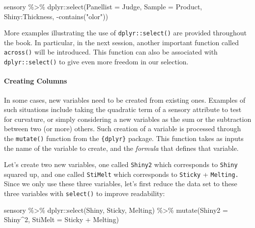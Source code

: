 \documentclass[
]{krantz}
\makeatletter
\newenvironment{Shaded}{\begin{snugshade}}{\end{snugshade}}
\newcommand{\AttributeTok}[1]{\textcolor[rgb]{0.61,0.61,0.61}{#1}}
\newcommand{\DecValTok}[1]{\textcolor[rgb]{0.06,0.06,0.06}{#1}}
\newcommand{\FunctionTok}[1]{\textcolor[rgb]{0,0,0}{#1}}
\newcommand{\NormalTok}[1]{#1}
\newcommand{\SpecialCharTok}[1]{\textcolor[rgb]{0,0,0}{#1}}
\newcommand{\StringTok}[1]{\textcolor[rgb]{0.5,0.5,0.5}{#1}}
\newenvironment{kframe}{%
\medskip{}
\setlength{\fboxsep}{.8em}
 \def\at@end@of@kframe{}%
 \ifinner\ifhmode%
  \def\at@end@of@kframe{\end{minipage}}%
  \begin{minipage}{\columnwidth}%
 \fi\fi%
 \def\FrameCommand##1{\hskip\@totalleftmargin \hskip-\fboxsep
 \colorbox{shadecolor}{##1}\hskip-\fboxsep
     \hskip-\linewidth \hskip-\@totalleftmargin \hskip\columnwidth}%
 \MakeFramed {\advance\hsize-\width
   \@totalleftmargin\z@ \linewidth\hsize
   \@setminipage}}%
 {\par\unskip\endMakeFramed%
 \at@end@of@kframe}
\renewenvironment{Shaded}{\begin{kframe}}{\end{kframe}}
\makeatother
\begin{document}
\begin{Shaded}
\begin{Highlighting}[]
\NormalTok{sensory }\SpecialCharTok{\%\textgreater{}\%}
\NormalTok{  dplyr}\SpecialCharTok{::}\FunctionTok{select}\NormalTok{(}\AttributeTok{Panellist =}\NormalTok{ Judge, }\AttributeTok{Sample =}\NormalTok{ Product, }
\NormalTok{                Shiny}\SpecialCharTok{:}\NormalTok{Thickness, }\SpecialCharTok{{-}}\FunctionTok{contains}\NormalTok{(}\StringTok{"olor"}\NormalTok{))}
\end{Highlighting}
\end{Shaded}

More examples illustrating the use of \texttt{dplyr::select()} are provided throughout the book. In particular, in the next session, another important function called \texttt{across()} will be introduced. This function can also be associated with \texttt{dplyr::select()} to give even more freedom in our selection.

\hypertarget{creating-columns}{%
\paragraph*{Creating Columns}\label{creating-columns}}

In some cases, new variables need to be created from existing ones. Examples of such situations include taking the quadratic term of a sensory attribute to test for curvature, or simply considering a new variables as the sum or the subtraction between two (or more) others. Such creation of a variable is processed through the \texttt{mutate()} function from the \texttt{\{dplyr\}} package. This function takes as inputs the name of the variable to create, and the \emph{formula} that defines that variable.

Let's create two new variables, one called \texttt{Shiny2} which corresponds to \texttt{Shiny} squared up, and one called \texttt{StiMelt} which corresponds to \texttt{Sticky} + \texttt{Melting.} Since we only use these three variables, let's first reduce the data set to these three variables with \texttt{select()} to improve readability:

\begin{Shaded}
\begin{Highlighting}[]
\NormalTok{sensory }\SpecialCharTok{\%\textgreater{}\%}
\NormalTok{  dplyr}\SpecialCharTok{::}\FunctionTok{select}\NormalTok{(Shiny, Sticky, Melting) }\SpecialCharTok{\%\textgreater{}\%}
  \FunctionTok{mutate}\NormalTok{(}\AttributeTok{Shiny2 =}\NormalTok{ Shiny}\SpecialCharTok{\^{}}\DecValTok{2}\NormalTok{,}
         \AttributeTok{StiMelt =}\NormalTok{ Sticky }\SpecialCharTok{+}\NormalTok{ Melting)}
\end{Highlighting}
\end{Shaded}
\end{document}
